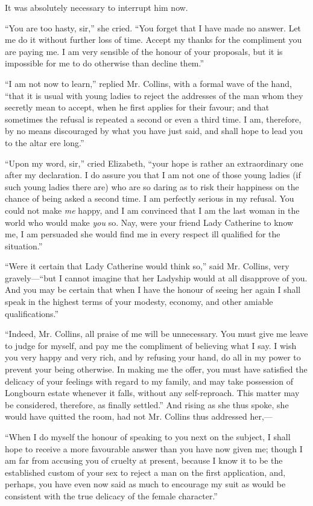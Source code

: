 It was absolutely necessary to interrupt him now.

``You are too hasty, sir,'' she cried. ``You forget that I have made no answer. Let me do it without further loss of time. Accept my thanks for the compliment you are paying me. I am very sensible of the honour of your proposals, but it is impossible for me to do otherwise than decline them.''

``I am not now to learn,'' replied Mr. Collins, with a formal wave of the hand, ``that it is usual with young ladies to reject the addresses of the man whom they secretly mean to accept, when he first applies for their favour; and that sometimes the refusal is repeated a second or even a third time. I am, therefore, by no means discouraged by what you have just said, and shall hope to lead you to the altar ere long.''

``Upon my word, sir,'' cried Elizabeth, ``your hope is rather an extraordinary one after my declaration. I do assure you that I am not one of those young ladies (if such young ladies there are) who are so daring as to risk their happiness on the chance of being asked a second time. I am perfectly serious in my refusal. You could not make \textit{me} happy, and I am convinced that I am the last woman in the world who would make \textit{you} so. Nay, were your friend Lady Catherine to know me, I am persuaded she would find me in every respect ill qualified for the situation.''

``Were it certain that Lady Catherine would think so,'' said Mr. Collins, very gravely---``but I cannot imagine that her Ladyship would at all disapprove of you. And you may be certain that when I have the honour of seeing her again I shall speak in the highest terms of your modesty, economy, and other amiable qualifications.''

``Indeed, Mr. Collins, all praise of me will be unnecessary. You must give me leave to judge for myself, and pay me the compliment of believing what I say. I wish you very happy and very rich, and by refusing your hand, do all in my power to prevent your being otherwise. In making me the offer, you must have satisfied the delicacy of your feelings with regard to my family, and may take possession of Longbourn estate whenever it falls, without any self-reproach. This matter may be considered, therefore, as finally settled.'' And rising as she thus spoke, she would have quitted the room, had not Mr. Collins thus addressed her,---

``When I do myself the honour of speaking to you next on the subject, I shall hope to receive a more favourable answer than you have now given me; though I am far from accusing you of cruelty at present, because I know it to be the established custom of your sex to reject a man on the first application, and, perhaps, you have even now said as much to encourage my suit as would be consistent with the true delicacy of the female character.''

